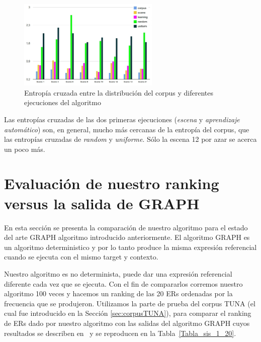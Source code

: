 \begin{figure}[ht]
\centering
\includegraphics[width=0.6\textwidth]{images/entropy.jpg}
\caption{Entrop\'ia cruzada entre la distribuci\'on del corpus y diferentes ejecuciones del algoritmo}\label{Entropy}
\end{figure}
  
Las entrop\'{i}as cruzadas de las dos primeras ejecuciones (\emph{escena} y \emph{aprendizaje autom\'atico}) son, en general, mucho m\'as cercanas de la entrop\'{i}a del corpus, que las entrop\'ias cruzadas de \emph{random} y \emph{uniforme}. S\'olo la escena 12  por azar se acerca un poco m\'as.



\section{Evaluaci\'on de nuestro ranking versus la salida de GRAPH } \label{sec:automaticevaluation}

En esta secci\'on se presenta la comparaci\'on de nuestro algoritmo para el estado del arte GRAPH algoritmo introducido anteriormente. El algoritmo GRAPH es un algoritmo deterministico y por lo tanto produce la misma expresi\'on referencial cuando se ejecuta con el mismo target y contexto. 

Nuestro algoritmo es no determinista, puede dar una expresi\'on referencial diferente cada vez que se ejecuta. Con el fin de compararlos corremos nuestro algoritmo 100 veces y hacemos un ranking de las 20 ERs ordenadas por la frecuencia que se produjeron. Utilizamos la parte de prueba del corpus TUNA (el cual fue introducido en la Secci\'on \ref{sec:corpusTUNA}), para comparar el ranking de ERs dado por nuestro algoritmo con las salidas del algoritmo GRAPH cuyos resultados se describen en~\cite{KrahmerGRAPH} y se reproducen en la Tabla~\ref{Tabla_sis_1_20}.

